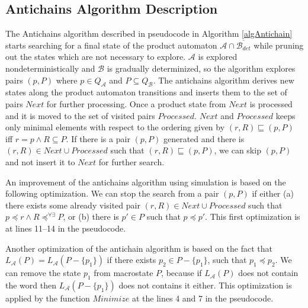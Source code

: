 \subsection{Antichains Algorithm Description}
The Antichains algorithm \cite{cav06} described in pseudocode in Algorithm \ref{algAntichain} 
starts searching for a final state of the product automaton $\mathcal{A}\cap \overline{\mathcal{B}_{det}}$ while
pruning out the states which are not necessary to explore. $\mathcal{A}$ is explored nondeterministically and $\mathcal{B}$ 
is gradually determinized, so the algorithm explores pairs $(p,P)$ where $p\in Q_\mathcal{A}$ and $P \subseteq Q_\mathcal{B}$. 
The antichains algorithm derives new states along the product automaton transitions and inserts them to the set of pairs $Next$ for further processing. 
Once a product state from $Next$ is processed and it is moved to the set of visited pairs $Processed$.
$Next$ and $Processed$ keeps only minimal elements with respect to the ordering given by $(r,R)\sqsubseteq (p,P)$ iff $r=p \wedge R \subseteq P$. 
If there is a pair $(p,P)$ generated and there is 
$(r,R)\in Next\cup Processed$ such that $(r,R) \sqsubseteq (p,P)$, we can skip $(p,P)$ and not insert it to $Next$ for further search.
 
An improvement of the antichains algorithm using simulation \cite{tacas10} is based on the following optimization. 
We can stop the search from a pair $(p,P)$ if either (a) there exists some already visited pair $(r,R) \in Next\cup Processed$ 
such that $p\preceq r \wedge R\preceq^{\forall\exists}P$, 
or (b) there is $p' \in P$ such that $p \preceq p'$. This first
optimization is at lines 11--14 in the pseudocode.

Another optimization \cite{tacas10} of the antichain algorithm is based on the fact 
that $L_\mathcal{A}(P)=L_\mathcal{A}(P-\{p_1\})$ if there exists $p_2 \in P-\{p_1\}$, such that $p_1 \preceq p_2$. We can remove the state $p_1$ 
from macrostate $P$, because if $L_\mathcal{A}(P)$ does not contain the word 
then $L_\mathcal{A}(P-\{p_1\})$ does not contains it either. This optimization is applied by the function $Minimize$ at
the lines 4 and 7 in the pseudocode.

